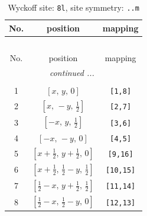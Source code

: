 \documentclass[fleqn,8pt]{jsarticle}
\begin{document}
\begin{longtable}{ccc}
\caption{Wyckoff site: {\tt 8l}, site symmetry: {\tt ..m}}
 \\
 \hline \hline
No. & position & mapping \\ \hline \endfirsthead

\multicolumn{2}{l}{\tablename\ \thetable{}} \\
 \hline \hline
No. & position & mapping \\ \hline \endhead

 \hline \hline
\multicolumn{2}{r}{\footnotesize\it continued ...} \\ \endfoot

 \hline \hline
\multicolumn{2}{r}{} \\ \endlastfoot

1 & $\left[ x,\, y,\, 0 \right]$ & {\tt [1,8]} \\ \hline
2 & $\left[ x,\, - y,\, \frac{1}{2} \right]$ & {\tt [2,7]} \\ \hline
3 & $\left[ - x,\, y,\, \frac{1}{2} \right]$ & {\tt [3,6]} \\ \hline
4 & $\left[ - x,\, - y,\, 0 \right]$ & {\tt [4,5]} \\ \hline
5 & $\left[ x + \frac{1}{2},\, y + \frac{1}{2},\, 0 \right]$ & {\tt [9,16]} \\ \hline
6 & $\left[ x + \frac{1}{2},\, \frac{1}{2} - y,\, \frac{1}{2} \right]$ & {\tt [10,15]} \\ \hline
7 & $\left[ \frac{1}{2} - x,\, y + \frac{1}{2},\, \frac{1}{2} \right]$ & {\tt [11,14]} \\ \hline
8 & $\left[ \frac{1}{2} - x,\, \frac{1}{2} - y,\, 0 \right]$ & {\tt [12,13]} \\
\end{longtable}
\renewcommand{\arraystretch}{1.2}
\end{document}
